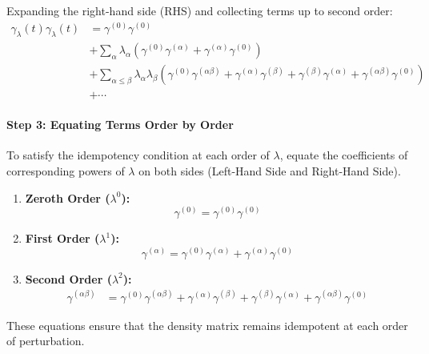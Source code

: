 Expanding the right-hand side (RHS) and collecting terms up to second order:
\begin{align}
\gamma_{\lambda}(t) \gamma_{\lambda}(t) &= \gamma^{(0)} \gamma^{(0)} \nonumber \\
&+ \sum_{\alpha} \lambda_{\alpha} \left( \gamma^{(0)} \gamma^{(\alpha)} + \gamma^{(\alpha)} \gamma^{(0)} \right) \nonumber \\
&+ \sum_{\alpha \leq \beta} \lambda_{\alpha} \lambda_{\beta} \left( \gamma^{(0)} \gamma^{(\alpha \beta)} + \gamma^{(\alpha)} \gamma^{(\beta)} + \gamma^{(\beta)} \gamma^{(\alpha)} + \gamma^{(\alpha \beta)} \gamma^{(0)} \right) \nonumber \\
&+ \cdots \end{align}

\paragraph{Step 3: Equating Terms Order by Order}

To satisfy the idempotency condition at each order of \( \lambda \), equate the coefficients of corresponding powers of \( \lambda \) on both sides (Left-Hand Side and Right-Hand Side).

\begin{enumerate}
    \item \textbf{Zeroth Order (\( \lambda^0 \)):}
    \begin{equation}
    \gamma^{(0)} = \gamma^{(0)} \gamma^{(0)} 
    \end{equation}
    
    \item \textbf{First Order (\( \lambda^1 \)):}
    \begin{equation}
    \gamma^{(\alpha)} = \gamma^{(0)} \gamma^{(\alpha)} + \gamma^{(\alpha)} \gamma^{(0)} 
    \end{equation}
    
    \item \textbf{Second Order (\( \lambda^2 \)):}
    \begin{align}
    \gamma^{(\alpha \beta)} &= \gamma^{(0)} \gamma^{(\alpha \beta)} + \gamma^{(\alpha)} \gamma^{(\beta)} + \gamma^{(\beta)} \gamma^{(\alpha)} + \gamma^{(\alpha \beta)} \gamma^{(0)} 
    \end{align}
\end{enumerate}

These equations ensure that the density matrix remains idempotent at each order of perturbation.

